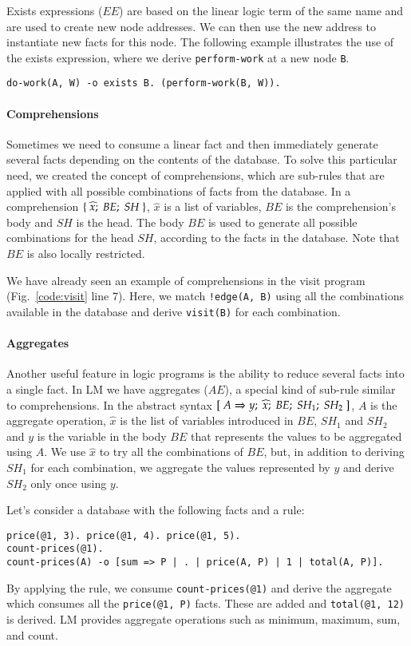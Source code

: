 Exists expressions ($EE$) are based on the linear logic term of the same name and are used to create new node addresses.
We can then use the new address to instantiate new facts for this node.  
The following example illustrates the use of the exists expression, where we derive
\texttt{perform-work} at a new node \texttt{B}.

{\footnotesize
\begin{Verbatim}
do-work(A, W) -o exists B. (perform-work(B, W)).
\end{Verbatim}
}

\paragraph{Comprehensions}

Sometimes we need to consume a linear fact and then immediately generate several facts depending on
the contents of the database. To solve this particular need, we created the concept of comprehensions, which are
sub-rules that are applied with all possible combinations of facts from the database. In a comprehension $\{ \; \widehat{x}; \; BE; \; SH \; \}$, $\widehat{x}$ is a list of variables, $BE$ is the comprehension's body and $SH$ is the head.
The body $BE$ is used to generate all possible combinations for the head $SH$, according to the facts
in the database. Note that $BE$ is also locally restricted.

We have already seen an example of comprehensions in the visit program (Fig.~\ref{code:visit} line 7).
Here, we match \texttt{!edge(A, B)} using all the combinations available in the database and derive \texttt{visit(B)}
for each combination.

\paragraph{Aggregates}

Another useful feature in logic programs is the ability to reduce several facts into a single fact.
In LM we have aggregates ($AE$), a special kind of sub-rule similar to comprehensions.
In the abstract syntax $[\; A \Rightarrow y; \; \widehat{x}; \; BE; \; SH_1; \; SH_2 \;]$, $A$ is the aggregate operation, $\widehat{x}$ is the list of variables
introduced in $BE$, $SH_1$ and $SH_2$ and $y$ is the variable in the body
$BE$ that represents the values to be aggregated using $A$.
We use $\widehat{x}$ to try all the combinations of $BE$, but, in addition to deriving $SH_1$ for each combination,
we aggregate the values represented by $y$ and derive $SH_2$ only once using $y$.

Let's consider a database with the following facts and a rule:

{\footnotesize
\begin{Verbatim}
price(@1, 3). price(@1, 4). price(@1, 5).
count-prices(@1).
count-prices(A) -o [sum => P | . | price(A, P) | 1 | total(A, P)].
\end{Verbatim}
}

By applying the rule, we consume \texttt{count-prices(@1)} and
derive the aggregate which consumes all the \texttt{price(@1, P)} facts.
These are added and \texttt{total(@1,~12)} is derived.
LM provides aggregate operations such as minimum, maximum, sum, and count.

\vspace{-4mm}